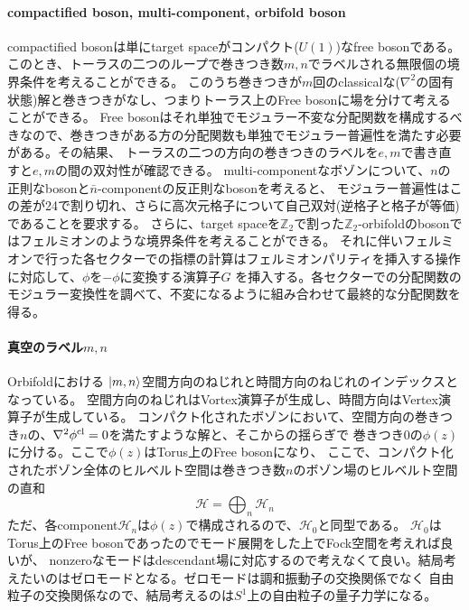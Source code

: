 \documentclass[11pt, aps, longbibliography]{article}
\numberwithin{equation}{section}
\begin{document}
    \paragraph{compactified boson, multi-component, orbifold boson}
    compactified bosonは単にtarget spaceがコンパクト($U(1)$)なfree bosonである。
    このとき、トーラスの二つのループで巻きつき数$m,n$でラベルされる無限個の境界条件を考えることができる。
    このうち巻きつきが$m$回のclassicalな($\nabla^2$の固有状態)解と巻きつきがなし、つまりトーラス上のFree bosonに場を分けて考えることができる。
    Free bosonはそれ単独でモジュラー不変な分配関数を構成するべきなので、巻きつきがある方の分配関数も単独でモジュラー普遍性を満たす必要がある。その結果、
    トーラスの二つの方向の巻きつきのラベルを$e,m$で書き直すと$e,m$の間の双対性が確認できる。
    multi-componentなボゾンについて、$n$の正則なbosonと$\bar{n}$-componentの反正則なbosonを考えると、
    モジュラー普遍性はこの差が24で割り切れ、さらに高次元格子について自己双対(逆格子と格子が等価)であることを要求する。
    さらに、target spaceを$\mathbb{Z}_2$で割った$\mathbb{Z}_2$-orbifoldのbosonではフェルミオンのような境界条件を考えることができる。
    それに伴いフェルミオンで行った各セクターでの指標の計算はフェルミオンパリティを挿入する操作に対応して、$\phi$を$-\phi$に変換する演算子$G$
    を挿入する。各セクターでの分配関数のモジュラー変換性を調べて、不変になるように組み合わせて最終的な分配関数を得る。

    \paragraph{真空のラベル$m,n$}
    Orbifoldにおける
    $\ket{m,n}$空間方向のねじれと時間方向のねじれのインデックスとなっている。
    空間方向のねじれはVortex演算子が生成し、時間方向はVertex演算子が生成している。
    コンパクト化されたボゾンにおいて、空間方向の巻きつき$n$の、$\nabla^2 \phi^{\rm cl}=0$を満たすような解と、そこからの揺らぎで
    巻きつき$0$の$\phi(z)$に分ける。ここで$\phi(z)$はTorus上のFree bosonになり、
    ここで、コンパクト化されたボゾン全体のヒルベルト空間は巻きつき数$n$のボゾン場のヒルベルト空間の直和
    \begin{equation}
        \mathcal{H} = \bigoplus_{n}\mathcal{H}_n
    \end{equation}
    ただ、各component$\mathcal{H}_n$は$\phi(z)$で構成されるので、$\mathcal{H}_0$と同型である。
    $\mathcal{H}_0$はTorus上のFree bosonであったのでモード展開をした上でFock空間を考えれば良いが、
    nonzeroなモードはdescendant場に対応するので考えなくて良い。結局考えたいのはゼロモードとなる。ゼロモードは調和振動子の交換関係でなく
    自由粒子の交換関係なので、結局考えるのは$S^1$上の自由粒子の量子力学になる。
\end{document}
